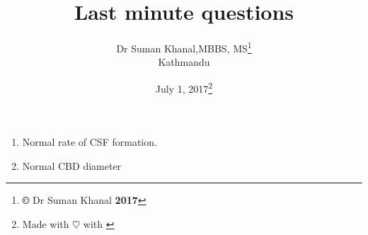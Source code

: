 \documentclass[12pt]{article}
\title{Last minute questions}
\author{Dr Suman Khanal,MBBS, MS\footnote{\textbf{\copyright} Dr Suman Khanal \textbf{2017}}\\ Kathmandu}
\date{July 1, 2017\footnote{Made with $\heartsuit$ with \href{https://www.latex-project.org/}{\LaTeXe}}}
\begin{document}
\maketitle



\begin{enumerate}
	\item Normal rate of CSF formation.
	\item Normal CBD diameter
	
\end{enumerate}
\end{document}
